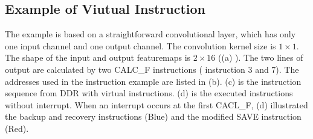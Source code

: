 \subsection{Example of Viutual Instruction}
\label{sec:exampleVirtual}


The example is based on a straightforward convolutional layer, which has only one input channel and one output channel. 
The convolution kernel size is $1 \times 1$. The shape of the input and output featuremaps is $ 2 \times 16 $ ((a) ). The two lines of output are calculated by two CALC\_F instructions ( instruction 3 and 7). The addresses used in the instruction example are listed in (b). (c) is the instruction sequence from DDR with virtual instructions. (d) is the executed instructions without interrupt. When an interrupt occurs at the first CACL\_F, (d) illustrated the backup and recovery instructions (Blue) and the modified SAVE instruction (Red).

